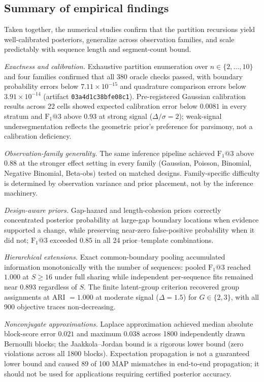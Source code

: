 

\FloatBarrier
\subsection{Summary of empirical findings}
Taken together, the numerical studies confirm that the partition recursions yield well-calibrated posteriors, generalize across observation families, and scale predictably with sequence length and segment-count bound.

\textit{Exactness and calibration.} Exhaustive partition enumeration over $n\in\{2,\ldots,10\}$ and four families confirmed that all 380 oracle checks passed, with boundary probability errors below $7.11\times10^{-15}$ and quadrature comparison errors below $3.91\times10^{-14}$ (artifact \texttt{03a4d1c38bfe08c1}). Pre-registered Gaussian calibration results across 22 cells showed expected calibration error below $0.0081$ in every stratum and $\mathrm{F_1}@3$ above $0.93$ at strong signal ($\Delta/\sigma=2$); weak-signal undersegmentation reflects the geometric prior's preference for parsimony, not a calibration deficiency.

\textit{Observation-family generality.} The same inference pipeline achieved $\mathrm{F_1}@3$ above $0.88$ at the stronger effect setting in every family (Gaussian, Poisson, Binomial, Negative Binomial, Beta-obs) tested on matched designs. Family-specific difficulty is determined by observation variance and prior placement, not by the inference machinery.

\textit{Design-aware priors.} Gap-hazard and length-cohesion priors correctly concentrated posterior probability at large-gap boundary locations when evidence supported a change, while preserving near-zero false-positive probability when it did not; $\mathrm{F_1}@3$ exceeded $0.85$ in all 24 prior--template combinations.

\textit{Hierarchical extensions.} Exact common-boundary pooling accumulated information monotonically with the number of sequences: pooled $\mathrm{F_1}@3$ reached $1.000$ at $S\geq16$ under full sharing while independent per-sequence fits remained near $0.893$ regardless of $S$. The finite latent-group criterion recovered group assignments at ARI $= 1.000$ at moderate signal ($\Delta=1.5$) for $G\in\{2,3\}$, with all 900 objective traces non-decreasing.

\textit{Nonconjugate approximations.} Laplace approximation achieved median absolute block-score error $0.021$ and maximum $0.038$ across 1800 independently drawn Bernoulli blocks; the Jaakkola--Jordan bound is a rigorous lower bound (zero violations across all 1800 blocks). Expectation propagation is not a guaranteed lower bound and caused 89 of 100 MAP mismatches in end-to-end propagation; it should not be used for applications requiring certified posterior accuracy.


